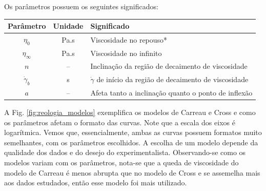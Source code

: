 \begin{apendicesenv}
Os parâmetros possuem os seguintes significados:

\begin{table}[H]
		{%
		\begin{tabular}{c c p{9cm}}
			\toprule
			   Parâmetro     & Unidade   & Significado                                                     \\ \midrule
			    \(\eta_0\)     & Pa.s      & Viscosidade no repouso*                                         \\
			\(\eta_{\infty}\)  & Pa.s      & Viscosidade no infinito                                         \\
			      \(n\)        & --        & Inclinação da região de decaimento de viscosidade               \\
			\(\dot{\gamma}_b\) & s\menosUm & \(\dot{\gamma}\) de início da região de decaimento de viscosidade \\ \midrule
			      \(a\)        & --        & Afeta tanto a inclinação quanto o ponto de inflexão             \\ \bottomrule
		\end{tabular}%
		}{}
\end{table}

A Fig. \ref{fig:reologia_modelos} exemplifica os modelos de Carreau e Cross e como os parâmetros afetam o formato das curvas. Note que a escala dos eixos é logarítmica. Vemos que, essencialmente, ambas as curvas possuem formatos muito semelhantes, com os parâmetros escolhidos. A escolha de um modelo depende da qualidade dos dados e do desejo do experimentalista. Observando-se como os modelos variam com os parâmetros, nota-se que a queda de viscosidade do modelo de Carreau é menos abrupta que no modelo de Cross e se assemelha mais aos dados estudados, então esse modelo foi mais utilizado.


\end{apendicesenv}
